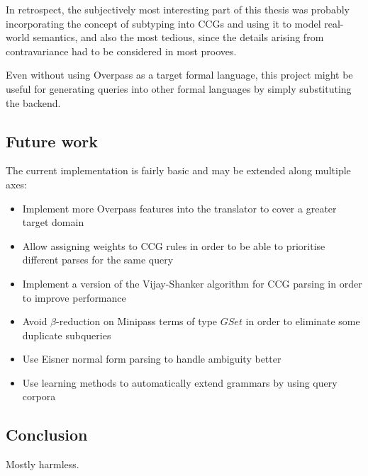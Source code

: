 \documentclass[main.tex]{subfiles}
\begin{document}
In retrospect, the subjectively most interesting part of this thesis was probably
incorporating the concept of subtyping into CCGs and using it to model
real-world semantics, and also the most tedious, since the details arising
from contravariance had to be considered in most prooves.

Even without using Overpass as a target formal language, this project might be
useful for generating queries into other formal languages by simply
substituting the backend.

\pagebreak
\subsection{Future work}
The current implementation is fairly basic and may be extended along multiple
axes:

\begin{itemize}
    \item Implement more Overpass features into the translator to cover a greater
        target domain
    \item Allow assigning weights to CCG rules in order to be able to prioritise
        different parses for the same query
    \item Implement a version of the Vijay-Shanker algorithm for CCG parsing
        in order to improve performance
    \item Avoid $\beta$-reduction on Minipass terms of type $GSet$ in order
        to eliminate some duplicate subqueries
    \item Use Eisner normal form parsing to handle ambiguity better
    \item Use learning methods to automatically extend grammars by using
        query corpora
\end{itemize}

\subsection{Conclusion}
Mostly harmless.
\end{document}
